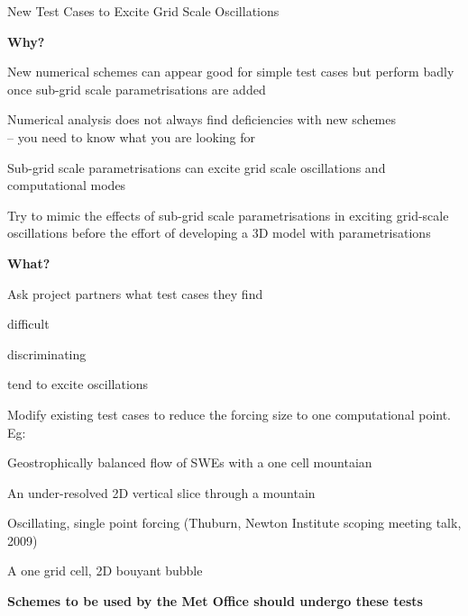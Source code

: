 \begin{slide}{New Test Cases to Excite Grid Scale Oscillations}

{\centering\large\bf
    Why?
}

\begin{list0}

\item New numerical schemes can appear good for simple test cases but perform badly once sub-grid scale parametrisations are added

\item Numerical analysis does not always find deficiencies with new schemes \\
-- you need to know what you are looking for

\item Sub-grid scale parametrisations can excite grid scale oscillations and computational modes

\item Try to mimic the effects of sub-grid scale parametrisations in exciting grid-scale oscillations before the effort of developing a 3D model with parametrisations

\end{list0}

{\centering\large\bf
    What?
}

\begin{list0}

\item Ask project partners what test cases they find
    \begin{list1}
    \item difficult
    \item discriminating
    \item tend to excite oscillations
    \end{list1}

\item Modify existing test cases to reduce the forcing size to one computational point. Eg:
    \begin{list1}
    \item Geostrophically balanced flow of SWEs with a one cell mountaian
    \item An under-resolved 2D vertical slice through a mountain
    \item Oscillating, single point forcing (Thuburn, Newton Institute scoping meeting talk, 2009)
    \item A one grid cell, 2D bouyant bubble
    \end{list1}

\end{list0}

{\bf Schemes to be used by the Met Office should undergo these tests}

\end{slide}




